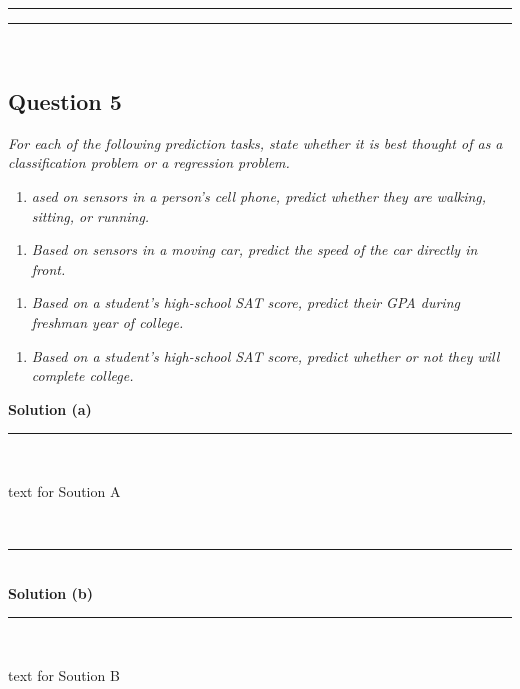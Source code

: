 \documentclass{article}
\begin{document}
\noindent\rule{\textwidth}{0.4pt}
\noindent\rule{\textwidth}{0.4pt}\\

\newpage

\newpage

\subsection*{Question 5}
\textit{For each of the following prediction tasks, state whether it is best thought of as a classification problem
or a regression problem.}\\

\begin{enumerate}[label=(a)]
  \item \textit{ased on sensors in a person's cell phone, predict whether they are walking, sitting, or running.}
\end{enumerate}

\begin{enumerate}[label=(b)]
  \item \textit{Based on sensors in a moving car, predict the speed of the car directly in front.}
\end{enumerate}

\begin{enumerate}[label=(c)]
  \item \textit{Based on a student's high-school SAT score, predict their GPA during freshman year of college.}
\end{enumerate}

\begin{enumerate}[label=(d)]
  \item \textit{Based on a student's high-school SAT score, predict whether or not they will complete college.}
\end{enumerate}

\textbf{Solution (a)}

\noindent\rule{\textwidth}{0.4pt}\\

\parbox{\textwidth}{text for Soution A}\\

\noindent\rule{\textwidth}{0.4pt}\\

\textbf{Solution (b)}

\noindent\rule{\textwidth}{0.4pt}\\

\parbox{\textwidth}{text for Soution B}\\
\end{document}

